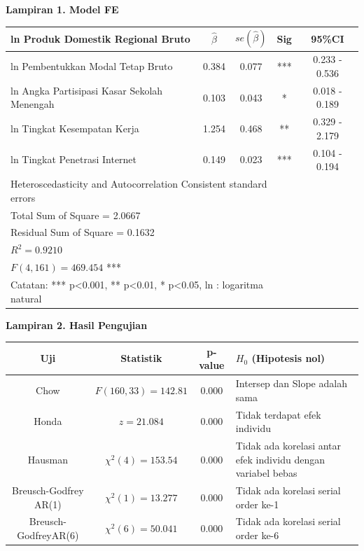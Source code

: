 \newpage
\singlespacing

\textbf{Lampiran 1. Model FE}

\begin{table}[h]
\centering
    \begin{tabular}[t]{p{7cm}cccc}
    \toprule
    ln Produk Domestik Regional Bruto & $\hat{\beta}$ & $se(\hat{\beta})$ & Sig & 95\%CI \\
    \midrule
    ln Pembentukkan Modal Tetap Bruto & 0.384  & 0.077  & ***  & 0.233 - 0.536 \\
    ln Angka Partisipasi Kasar Sekolah Menengah & 0.103  & 0.043  & *    & 0.018 - 0.189 \\
    ln Tingkat Kesempatan Kerja & 1.254  & 0.468  & **   & 0.329 - 2.179 \\
    ln Tingkat Penetrasi Internet & 0.149  & 0.023  & ***  & 0.104 - 0.194 \\
    \midrule
        \multicolumn{4}{l}{Heteroscedasticity and Autocorrelation Consistent standard errors}\\
    \midrule
        \multicolumn{4}{l}{Total Sum of Square = 2.0667} \\
        \multicolumn{4}{l}{Residual Sum of Square = 0.1632} \\
        \multicolumn{4}{l}{$R^{2}= 0.9210$} \\
        \multicolumn{4}{l}{$F(4, 161) = 469.454$ ***} \\
    \midrule
        \multicolumn{4}{l}{Catatan: *** p<0.001, ** p<0.01, * p<0.05, ln : logaritma natural}\\
    \bottomrule
    \end{tabular}
\end{table}


\textbf{Lampiran 2. Hasil Pengujian}

\begin{center}
\begin{tabular}{cccp{5cm}}
\toprule
Uji                 & Statistik             & p-value  & $H_0$ (Hipotesis nol) \\
\midrule
Chow                & $F(160, 33) = 142.81$ & 0.000    & Intersep dan Slope adalah sama \\
Honda               & $z = 21.084$          & 0.000    & Tidak terdapat efek individu    \\
Hausman             & $\chi^2(4) = 153.54$  & 0.000    & Tidak ada korelasi antar efek individu dengan variabel bebas\\
Breusch-Godfrey AR(1) & $\chi^2(1) = 13.277$  & 0.000    & Tidak ada korelasi serial order ke-1    \\
Breusch-GodfreyAR(6) & $\chi^2(6) = 50.041$  & 0.000    & Tidak ada korelasi serial order ke-6    \\
\bottomrule
\end{tabular}
\end{center}

